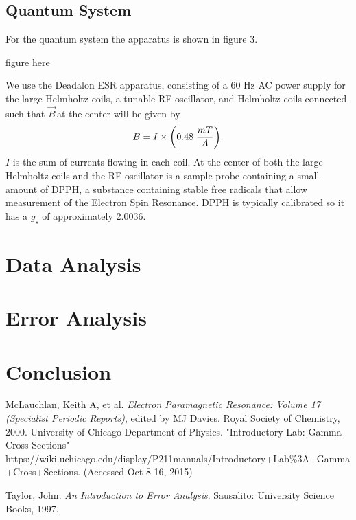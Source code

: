 \documentclass{article}
\newcommand{\B}{$\vec{B}\,$}
\begin{document}
	\subsection{Quantum System}
	For the quantum system the apparatus is shown in figure 3.

	figure here

	We use the Deadalon ESR apparatus, consisting of a 60 Hz AC power supply for the large Helmholtz coils, a tunable RF oscillator, and Helmholtz coils connected such that \B at the center will be given by
	\begin{equation*}
		B = I \times \bigg{(}0.48 \hspace{.1cm} \frac{mT}{A}\bigg{)}.
	\end{equation*}
	$I$ is the sum of currents flowing in each coil.  At the center of both the large Helmholtz coils and the RF oscillator is a sample probe containing a small amount of DPPH, a substance containing stable free radicals that allow measurement of the Electron Spin Resonance.  DPPH is typically calibrated so it has a $g_s$ of approximately 2.0036. \cite{DPPH}




\section{Data Analysis}

\section{Error Analysis}

\section{Conclusion}

\begin{thebibliography}{10}
		McLauchlan, Keith A, et al. \emph{Electron Paramagnetic Resonance: Volume 17 (Specialist Periodic Reports)}, edited by MJ Davies. Royal Society of Chemistry, 2000.
		University of Chicago Department of Physics. "Introductory Lab: Gamma Cross Sections"\\
		https://wiki.uchicago.edu/display/P211manuals/Introductory+Lab\%3A+Gamma+Cross+Sections. (Accessed Oct 8-16, 2015)

		Taylor, John. \emph{An Introduction to Error Analysis}. Sausalito: University Science Books, 1997.
		
\end{thebibliography}
\end{document}
